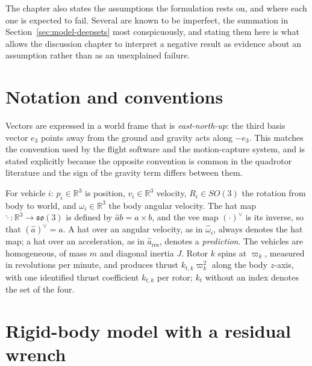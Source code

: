 The chapter also states the assumptions the formulation rests on, and where each one is expected
to fail. Several are known to be imperfect, the summation in
Section~\ref{sec:model-deepsets} most conspicuously, and stating them here is what allows
the discussion chapter to interpret a negative result as evidence about an assumption
rather than as an unexplained failure.

\section{Notation and conventions}
\label{sec:model-notation}

Vectors are expressed in a world frame that is \emph{east-north-up}: the third basis vector $e_3$
points away from the ground and gravity acts along $-e_3$. This matches the convention used by the
flight software and the motion-capture system, and is stated explicitly because the opposite
convention is common in the quadrotor literature and the sign of the gravity term differs between
them.

For vehicle $i$: $p_i \in \mathbb{R}^3$ is position, $v_i \in \mathbb{R}^3$ velocity,
$R_i \in SO(3)$ the rotation from body to world, and $\omega_i \in \mathbb{R}^3$ the body angular
velocity. The hat map $\hat{\cdot} : \mathbb{R}^3 \to \mathfrak{so}(3)$ is defined by
$\hat{a}b = a \times b$, and the vee map $(\cdot)^\vee$ is its inverse, so that
$(\hat a)^\vee = a$. A hat over an angular velocity, as in $\hat\omega_i$, always denotes the hat
map; a hat over an acceleration, as in $\hat a_{\mathrm{res}}$, denotes a \emph{prediction}. The
vehicles are homogeneous, of mass $m$ and diagonal inertia $J$. Rotor $k$ spins at $\varpi_k$,
measured in revolutions per minute, and produces thrust $k_{t,k}\varpi_k^2$ along the body
$z$-axis, with one identified thrust coefficient $k_{t,k}$ per rotor; $k_t$ without an index
denotes the set of the four.

\section{Rigid-body model with a residual wrench}
\label{sec:model-dynamics}

